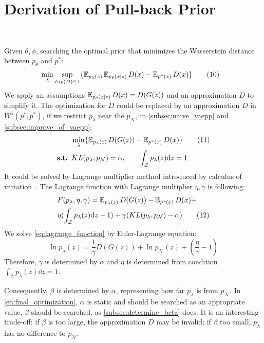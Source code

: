 \section{Derivation of Pull-back Prior}~\label{subsec:inference}

Given $\theta, \phi$, searching the optimal prior that minimizes the Wasserstein distance between $p_\theta$ and $p^*$:
\begin{align*}\label{eq:direct_2nd_optimization}
	& \min_{\lambda} \sup_{Lip(D) \leq 1} \{\operatorname{\mathbb{E}}_{p_\lambda(z)} \operatorname{\mathbb{E}}_{p_\theta(x|z)} D(x)  - \operatorname{\mathbb{E}}_{p^*(x)} D(x)\} 
	\tag{10}
\end{align*}
We apply an assumptions $\operatorname{\mathbb{E}}_{p_\theta(x|z)} D(x) = D(G(z))$ and an approximation $D$ to simplify it. The optimization for $D$ could be replaced by an approximation $D$ in $W^1(p^\dag, p^*)$, if we restrict $p_\lambda$ near the $p_\mathcal{N}$, \EG in \cref{subsec:naive_vaepp} and \cref{subsec:improve_of_vaepp}:
\begin{align*}\label{eq:final_optimization}
	& \min_{\lambda} \{\operatorname{\mathbb{E}}_{p_\lambda(z)} D(G(z))  - \operatorname{\mathbb{E}}_{p^*(x)} D(x)\} \tag{11} \\
	{\textbf{s.t. }} & KL(p_\lambda, p_\mathcal{N}) = \alpha, \qquad \int_{\mathcal{Z}} p_\lambda(z) \mathrm{d} z = 1
\end{align*}
It could be solved by Lagrange multiplier method introduced by calculus of variation~\cite{gelfand2000calculus}. The Lagrange function with Lagrange multiplier $\eta, \gamma$ is following:
\begin{align*}\label{eq:lagrange_function}
& F(p_\lambda, \eta, \gamma) = \operatorname{\mathbb{E}}_{p_\lambda(z)} D(G(z))  - \operatorname{\mathbb{E}}_{p^*(x)} D(x) + \\
& \eta (\int_{\mathcal{Z}} p_\lambda(z) \mathrm{d} z - 1) + \gamma(KL(p_\lambda, p_\mathcal{N}) - \alpha) \tag{12}
\end{align*}
We solve \cref{eq:lagrange_function} by Euler-Lagrange equation:
\begin{equation*}\label{eq:euler_lagrange_eqaution}
	\ln p_\lambda(z) = \frac{1}{\gamma} D(G(z)) + \ln p_\mathcal{N}(z) + (\frac{\eta}{\gamma} - 1) \tag{13}
\end{equation*}
Therefore, $\gamma$ is determined by $\alpha$ and $\eta$ is determined from condition $\int_{\mathcal{Z}} p_\lambda(z) \dd z = 1$.

 Consequently, $\beta$ is determined by $\alpha$, representing how far $p_\lambda$ is from $p_\mathcal{N}$. In \cref{eq:final_optimization}, $\alpha$ is static and should be searched as an appropriate value, \IE $\beta$ should be searched, as \cref{subsec:determine_beta} does. It is an interesting trade-off: if $\beta$ is too large, the approximation $D$ may be invalid; if $\beta$ too small, $p_\lambda$ has no difference to $p_\mathcal{N}$. 
 
 